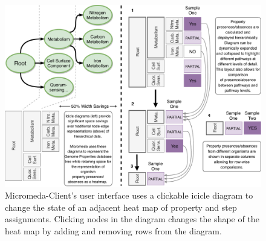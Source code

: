 \begin{figure}[!ht]
  \centering
	\includegraphics[width=\textwidth]{media/visualization_design_philosphy.pdf}
	 \caption{Micromeda-Client's user interface uses a clickable icicle diagram to change the state of an adjacent heat map of property and step assignments. Clicking nodes in the diagram changes the shape of the heat map by adding and removing rows from the diagram.}
	 \label{fig:visualization-philosphy}
\end{figure}

